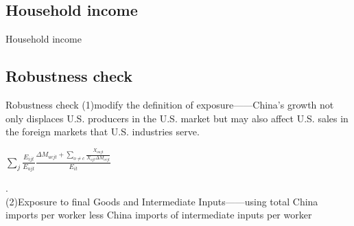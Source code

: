 \documentclass[10pt,aspectratio=43,mathserif,table]{beamer}
\begin{document}
\subsection{Household income}
\begin{frame}{Household income}
	\begin{figure}[thpb]
		\centering
	\end{figure}
\end{frame}

\subsection{Robustness check}
\begin{frame}{Robustness check}
	(1)modify the definition of exposure——China's growth not only displaces U.S. producers in the U.S. market but may also affect U.S. sales in the foreign markets that U.S. industries serve.
	 		
		\begin{center}		
			\LARGE $\sum_{j} \frac{E_{ijt}}{E_{ujt}} \frac{\Delta M_{ucjt} + \sum_{o \neq c} \frac{X_{oujt}}{X_{ojt} \Delta M_{ocjt} } }{E_{it}} $
		\end{center}
	.\\
	(2)Exposure to final Goods and Intermediate Inputs——using total China imports per worker less China imports of intermediate inputs per worker
\end{frame}
\end{document}
